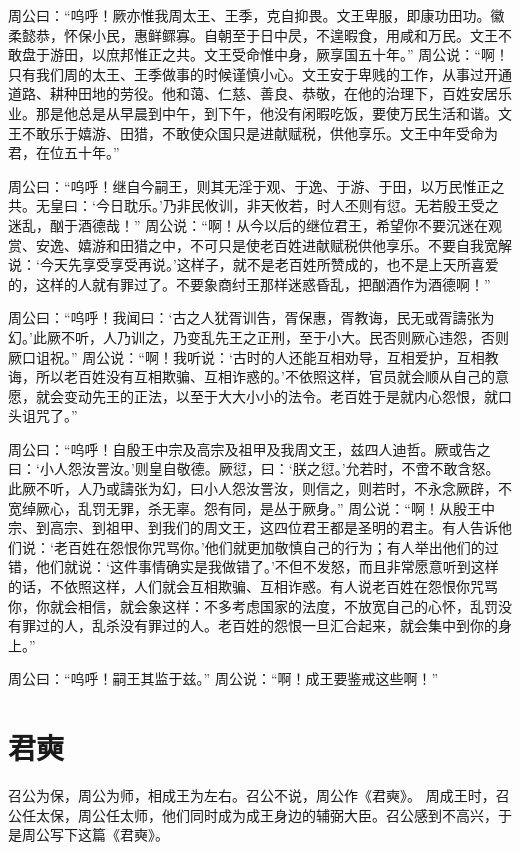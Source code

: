 \documentclass[12pt,UTF8]{ctexbook}
\begin{document}
周公曰：“呜呼！厥亦惟我周太王、王季，克自抑畏。文王卑服，即康功田功。徽柔懿恭，怀保小民，惠鲜鳏寡。自朝至于日中昃，不遑暇食，用咸和万民。文王不敢盘于游田，以庶邦惟正之共。文王受命惟中身，厥享国五十年。”
周公说：“啊！只有我们周的太王、王季做事的时候谨慎小心。文王安于卑贱的工作，从事过开通道路、耕种田地的劳役。他和蔼、仁慈、善良、恭敬，在他的治理下，百姓安居乐业。那是他总是从早晨到中午，到下午，他没有闲暇吃饭，要使万民生活和谐。文王不敢乐于嬉游、田猎，不敢使众国只是进献赋税，供他享乐。文王中年受命为君，在位五十年。”

周公曰：“呜呼！继自今嗣王，则其无淫于观、于逸、于游、于田，以万民惟正之共。无皇曰：‘今日耽乐。’乃非民攸训，非天攸若，时人丕则有愆。无若殷王受之迷乱，酗于酒德哉！”
周公说：“啊！从今以后的继位君王，希望你不要沉迷在观赏、安逸、嬉游和田猎之中，不可只是使老百姓进献赋税供他享乐。不要自我宽解说：‘今天先享受享受再说。’这样子，就不是老百姓所赞成的，也不是上天所喜爱的，这样的人就有罪过了。不要象商纣王那样迷惑昏乱，把酗酒作为酒德啊！”

周公曰：“呜呼！我闻曰：‘古之人犹胥训告，胥保惠，胥教诲，民无或胥譸张为幻。’此厥不听，人乃训之，乃变乱先王之正刑，至于小大。民否则厥心违怨，否则厥口诅祝。”
周公说：“啊！我听说：‘古时的人还能互相劝导，互相爱护，互相教诲，所以老百姓没有互相欺骗、互相诈惑的。’不依照这样，官员就会顺从自己的意愿，就会变动先王的正法，以至于大大小小的法令。老百姓于是就内心怨恨，就口头诅咒了。”

周公曰：“呜呼！自殷王中宗及高宗及祖甲及我周文王，兹四人迪哲。厥或告之曰：‘小人怨汝詈汝。’则皇自敬德。厥愆，曰：‘朕之愆。’允若时，不啻不敢含怒。此厥不听，人乃或譸张为幻，曰小人怨汝詈汝，则信之，则若时，不永念厥辟，不宽绰厥心，乱罚无罪，杀无辜。怨有同，是丛于厥身。”
周公说：“啊！从殷王中宗、到高宗、到祖甲、到我们的周文王，这四位君王都是圣明的君主。有人告诉他们说：‘老百姓在怨恨你咒骂你。’他们就更加敬慎自己的行为；有人举出他们的过错，他们就说：‘这件事情确实是我做错了。’不但不发怒，而且非常愿意听到这样的话，不依照这样，人们就会互相欺骗、互相诈惑。有人说老百姓在怨恨你咒骂你，你就会相信，就会象这样：不多考虑国家的法度，不放宽自己的心怀，乱罚没有罪过的人，乱杀没有罪过的人。老百姓的怨恨一旦汇合起来，就会集中到你的身上。”

周公曰：“呜呼！嗣王其监于兹。”
周公说：“啊！成王要鉴戒这些啊！”

\chapter{君奭}

召公为保，周公为师，相成王为左右。召公不说，周公作《君奭》。
周成王时，召公任太保，周公任太师，他们同时成为成王身边的辅弼大臣。召公感到不高兴，于是周公写下这篇《君奭》。
\end{document}
